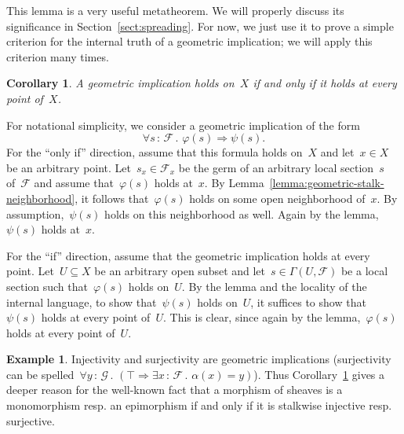 \documentclass[10pt,reqno,a4paper]{amsbook}
\makeatletter
\theoremstyle{definition}
\newtheorem{ex}[defn]{Example}
\theoremstyle{plain}
\newtheorem{cor}[defn]{Corollary}
\theoremstyle{remark}
\newcommand{\F}{\mathcal{F}}
\renewcommand{\G}{\mathcal{G}}
\newcommand{\?}{\,{:}\,}
\renewcommand{\_}{\mathpunct{.}\,}
\newcommand{\resp}{resp.\@\xspace}
\renewenvironment{proof}[1][\proofname]{\par
  \pushQED{\qed}%
  \normalfont \topsep6\p@\@plus6\p@\relax
  \trivlist
  \item[\hskip\labelsep
        \itshape
    #1\@addpunct{.}]\ignorespaces
}{%
  \popQED\endtrivlist\@endpefalse
}
\makeatother
\begin{document}
This lemma is a very useful metatheorem. We will properly discuss its
significance in Section~\ref{sect:spreading}. For now, we just use it to prove a
simple criterion for the internal truth of a geometric implication; we will
apply this criterion many times.

\begin{cor}\label{cor:geometric-implication}
A geometric implication holds on~$X$ if and only if it holds at
every point of~$X$.\end{cor}
\begin{proof}For notational simplicity, we consider a geometric implication of
the form
\[ \forall s\?\F\_ \varphi(s) \Rightarrow \psi(s). \]
For the ``only if'' direction, assume that this formula holds on~$X$ and let~$x
\in X$ be an arbitrary point. Let~$s_x \in \F_x$ be the germ of an arbitrary
local section~$s$ of~$\F$ and assume that~$\varphi(s)$ holds at~$x$. By
Lemma~\ref{lemma:geometric-stalk-neighborhood}, it follows that~$\varphi(s)$ holds on some open neighborhood of~$x$. By
assumption,~$\psi(s)$ holds on this neighborhood as well. Again by the
lemma,~$\psi(s)$ holds at~$x$.

For the ``if'' direction, assume that the geometric implication holds at every
point. Let~$U \subseteq X$ be an arbitrary open subset and let~$s \in
\Gamma(U,\F)$ be a local section such that~$\varphi(s)$ holds on~$U$. By the
lemma and the locality of the internal language, to show that~$\psi(s)$ holds
on~$U$, it suffices to show that~$\psi(s)$
holds at every point of~$U$. This is clear, since again by the
lemma,~$\varphi(s)$ holds at every point of~$U$.
\end{proof}

\begin{ex}Injectivity and surjectivity are geometric implications (surjectivity
can be spelled~$\forall y\?\G\_ (\top \Rightarrow \exists x\?\F\_ \alpha(x) =
y)$). Thus Corollary~\ref{cor:geometric-implication} gives a deeper reason for the well-known fact that a
morphism of sheaves is a monomorphism \resp an epimorphism if and only if it is
stalkwise injective \resp surjective.\end{ex}
\end{document}
